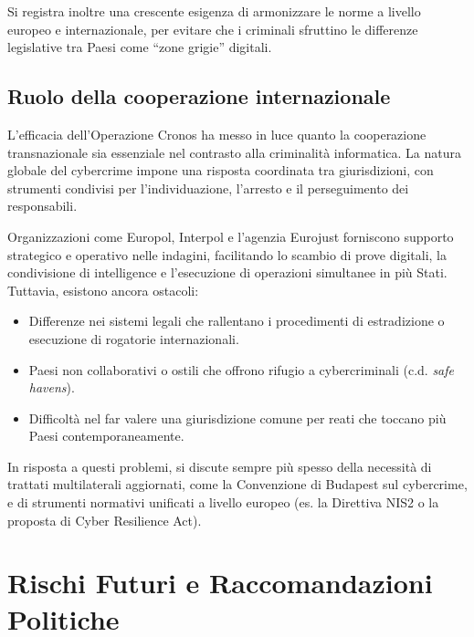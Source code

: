 \documentclass[a4paper,12pt]{article}
\begin{document}
Si registra inoltre una crescente esigenza di armonizzare le norme a livello europeo e internazionale, per evitare che i criminali sfruttino le differenze legislative tra Paesi come ``zone grigie'' digitali.

\subsection{Ruolo della cooperazione internazionale}
L’efficacia dell’Operazione Cronos ha messo in luce quanto la cooperazione transnazionale sia essenziale nel contrasto alla criminalità informatica. La natura globale del cybercrime impone una risposta coordinata tra giurisdizioni, con strumenti condivisi per l’individuazione, l’arresto e il perseguimento dei responsabili.

Organizzazioni come Europol, Interpol e l’agenzia Eurojust forniscono supporto strategico e operativo nelle indagini, facilitando lo scambio di prove digitali, la condivisione di intelligence e l’esecuzione di operazioni simultanee in più Stati. Tuttavia, esistono ancora ostacoli:

\begin{itemize}
    \item Differenze nei sistemi legali che rallentano i procedimenti di estradizione o esecuzione di rogatorie internazionali.
    \item Paesi non collaborativi o ostili che offrono rifugio a cybercriminali (c.d. \textit{safe havens}).
    \item Difficoltà nel far valere una giurisdizione comune per reati che toccano più Paesi contemporaneamente.
\end{itemize}

In risposta a questi problemi, si discute sempre più spesso della necessità di trattati multilaterali aggiornati, come la Convenzione di Budapest sul cybercrime, e di strumenti normativi unificati a livello europeo (es. la Direttiva NIS2 o la proposta di Cyber Resilience Act).


\section{Rischi Futuri e Raccomandazioni Politiche}
\end{document}
